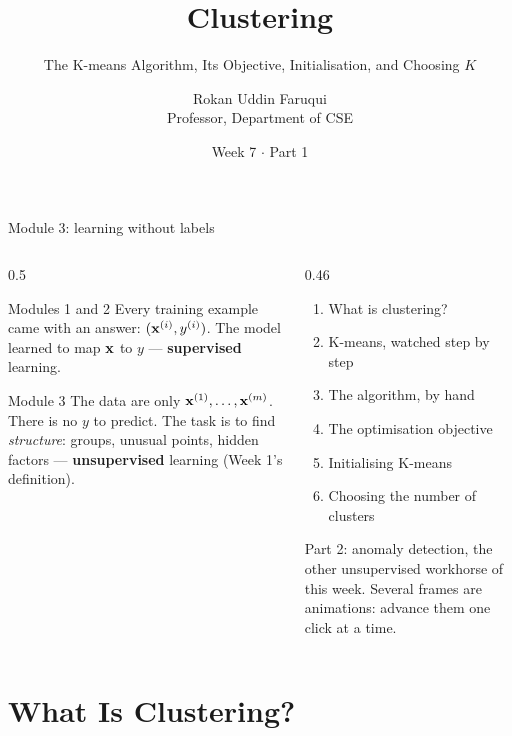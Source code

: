 \documentclass[aspectratio=169,10pt]{beamer}
\title[CSE 815 -- Week 7, Part 1]{Clustering}
\subtitle{The K-means Algorithm, Its Objective, Initialisation, and Choosing $K$}
\author{Rokan Uddin Faruqui\\ \small Professor, Department of CSE}
\institute{\small University of Chittagong \\ \texttt{rufaruqui@cu.ac.bd}}
\date[Week 7 / Part 1]{Week 7 $\cdot$ Part 1}
\begin{document}
\begin{frame}
  \titlepage
\end{frame}

\begin{frame}{Module 3: learning without labels}
  \begin{columns}[T,onlytextwidth]
    \begin{column}{0.5\textwidth}
      \begin{block}{Modules 1 and 2}
        \footnotesize
        Every training example came with an answer: $(\mathbf{x}^{(i)},y^{(i)})$. The model
        learned to map $\mathbf{x}$ to $y$ --- \textbf{supervised} learning.
      \end{block}
      \begin{block}{Module 3}
        \footnotesize
        The data are only $\mathbf{x}^{(1)},\dots,\mathbf{x}^{(m)}$. There is no $y$ to predict. The task
        is to find \emph{structure}: groups, unusual points, hidden factors ---
        \textbf{unsupervised} learning (Week 1's definition).
      \end{block}
    \end{column}
    \begin{column}{0.46\textwidth}
      \begin{keyidea}[Today]
        \footnotesize
        \begin{enumerate}
          \item What is clustering?
          \item K-means, watched step by step
          \item The algorithm, by hand
          \item The optimisation objective
          \item Initialising K-means
          \item Choosing the number of clusters
        \end{enumerate}
      \end{keyidea}
      \footnotesize Part 2: anomaly detection, the other unsupervised workhorse of this
      week. \textcolor{cugray}{Several frames are animations: advance them one click at a
      time.}
    \end{column}
  \end{columns}
\end{frame}

\section{What Is Clustering?}
\end{document}
